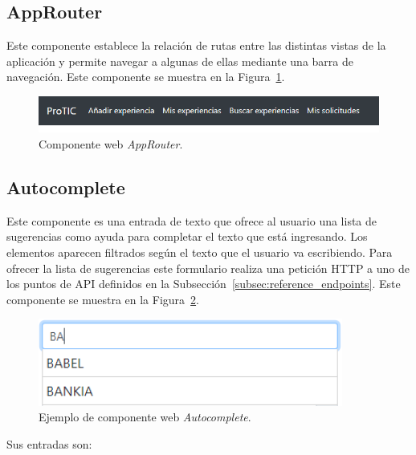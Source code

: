 \documentclass[a4paper, 12pt]{book}
\begin{document}
    \subsection{AppRouter}
    \label{subsec:wc_app_router}
    Este componente establece la relación de rutas entre las distintas vistas de la aplicación y permite navegar a algunas de ellas mediante una barra de navegación.
    Este componente se muestra en la Figura~\ref{fig:component_app_router}.

    \begin{figure}
        \centering
        \includegraphics[width=15cm, keepaspectratio]{img/AppRouter.PNG}
        \caption{Componente web \emph{AppRouter}.}\label{fig:component_app_router}
    \end{figure}

    \subsection{Autocomplete}
    \label{subsec:wc_autocomplete}
    Este componente es una entrada de texto que ofrece al usuario una lista de sugerencias como ayuda para completar el texto que está ingresando.
    Los elementos aparecen filtrados según el texto que el usuario va escribiendo.
    Para ofrecer la lista de sugerencias este formulario realiza una petición HTTP a uno de los puntos de API definidos en la Subsección~\ref{subsec:reference_endpoints}.
    Este componente se muestra en la Figura~\ref{fig:component_autocomplete}.

    \begin{figure}
        \centering
        \includegraphics[width=10cm, keepaspectratio]{img/Autocomplete.PNG}
        \caption{Ejemplo de componente web \emph{Autocomplete}.}\label{fig:component_autocomplete}
    \end{figure}

    Sus entradas son:
\end{document}
